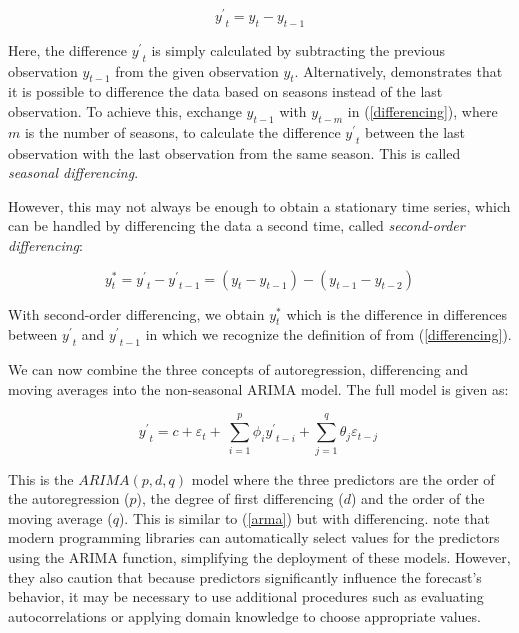 \documentclass[12pt,a4paper]{article}
\begin{document}
\begin{equation}
  {y^\prime}_t=y_t-y_{t-1}
  \label{differencing}
\end{equation}

Here, the difference ${y^\prime}_t$ is simply calculated by subtracting the previous observation $y_{t-1}$ from the given observation $y_t$. Alternatively, \cite{HyndmanForecasting2021} demonstrates that it is possible to difference the data based on seasons instead of the last observation. To achieve this, exchange $y_{t-1}$ with $y_{t-m}$ in (\ref{differencing}), where $m$ is the number of seasons, to calculate the difference ${y^\prime}_t$ between the last observation with the last observation from the same season. This is called \textit{seasonal differencing}.

However, this may not always be enough to obtain a stationary time series, which can be handled by differencing the data a second time, called \textit{second-order differencing}:

\begin{equation}
  y_t^\ast={y^\prime}_t-{y^\prime}_{t-1}=\left(y_t-y_{t-1}\right)-\left(y_{t-1}-y_{t-2}\right)
  \label{secondorderdifferencing}
\end{equation}

With second-order differencing, we obtain $y_t^\ast$ which is the difference in differences between ${y^\prime}_t$ and ${y^\prime}_{t-1}$ in which we recognize the definition of from (\ref{differencing}). 

We can now combine the three concepts of autoregression, differencing and moving averages into the non-seasonal ARIMA model. The full model is given as: 

\begin{equation}
  {y^\prime}_t=c+\varepsilon_t+\ \sum_{i=1}^{p}{\phi_i{y^\prime}_{t-i}}+\sum_{j=1}^{q}{\theta_j\varepsilon_{t-j}\ }
  \label{arima}
\end{equation}

This is the $ARIMA(p, d, q)$ model where the three predictors are the order of the autoregression ($p$), the degree of first differencing ($d$) and the order of the moving average ($q$). This is similar to (\ref{arma}) but with differencing. \cite{HyndmanForecasting2021} note that modern programming libraries can automatically select values for the predictors using the ARIMA function, simplifying the deployment of these models. However, they also caution that because predictors significantly influence the forecast's behavior, it may be necessary to use additional procedures such as evaluating autocorrelations or applying domain knowledge to choose appropriate values.
\end{document}
